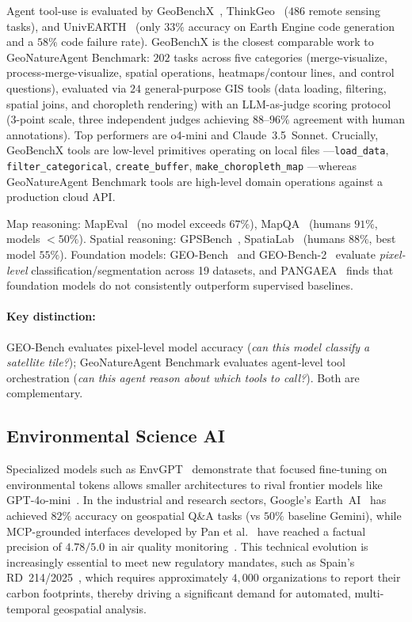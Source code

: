 \documentclass[sigconf]{acmart}
\begin{document}
Agent tool-use is evaluated by GeoBenchX~\citep{krechetova2025geobenchx}, ThinkGeo~\citep{shabbir2025thinkgeo} ($486$ remote sensing tasks), and UnivEARTH~\citep{kao2025univearth} (only $33\%$ accuracy on Earth Engine code generation and a $58\%$ code failure rate). GeoBenchX is the closest comparable work to GeoNatureAgent Benchmark: $202$ tasks across five categories (merge-visualize, process-merge-visualize, spatial operations, heatmaps/contour lines, and control questions), evaluated via $24$ general-purpose GIS tools (data loading, filtering, spatial joins, and choropleth rendering) with an LLM-as-judge scoring protocol (3-point scale, three independent judges achieving $88$--$96\%$ agreement with human annotations). Top performers are o4-mini and Claude~3.5~Sonnet. Crucially, GeoBenchX tools are low-level primitives operating on local files ---\texttt{load\_data}, \texttt{filter\_categorical}, \texttt{create\_buffer}, \texttt{make\_\allowbreak choropleth\_\allowbreak map} ---whereas GeoNatureAgent Benchmark tools are high-level domain operations against a production cloud API.

Map reasoning: MapEval~\citep{dihan2025mapeval} (no model exceeds $67\%$), MapQA~\citep{arnold2025mapqa} (humans $91\%$, models $<50\%$). Spatial reasoning: GPSBench~\citep{truong2026gpsbench}, SpatiaLab~\citep{wasi2026spatialab} (humans $88\%$, best model $55\%$). Foundation models: GEO-Bench~\citep{lacoste2023geobench} and GEO-Bench-2~\citep{simumba2025geobench2} evaluate \emph{pixel-level} classification/segmentation across 19 datasets, and PANGAEA~\citep{marsocci2024pangaea} finds that foundation models do not consistently outperform supervised baselines.

\paragraph{Key distinction:}
GEO-Bench evaluates pixel-level model accuracy (\emph{can this model classify a satellite tile?}); GeoNatureAgent Benchmark evaluates agent-level tool orchestration (\emph{can this agent reason about which tools to call?}). Both are complementary.


\subsection{Environmental Science AI}

Specialized models such as EnvGPT~\citep{zhang2025envgpt} demonstrate that focused fine-tuning on environmental tokens allows smaller architectures to rival frontier models like GPT-4o-mini~\citep{zhang2025envgpt}. In the industrial and research sectors, Google’s Earth~AI~\citep{google2025earthai} has achieved $82\%$ accuracy on geospatial Q\&A tasks (vs $50\%$ baseline Gemini), while MCP-grounded interfaces developed by Pan et al.~\citep{pan2025mcpairquality} have reached a factual precision of $4.78/5.0$ in air quality monitoring~\citep{pan2025mcpairquality}. This technical evolution is increasingly essential to meet new regulatory mandates, such as Spain’s RD~214/2025~\citep{spain2025rd214}, which requires approximately $4,000$ organizations to report their carbon footprints, thereby driving a significant demand for automated, multi-temporal geospatial analysis.
\end{document}
